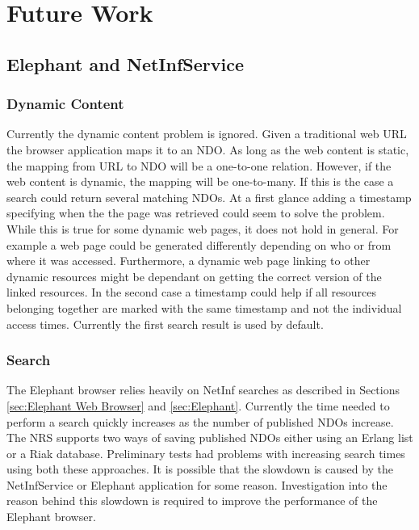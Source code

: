 \section{Future Work}

\subsection{Elephant and NetInfService}

\subsubsection{Dynamic Content}

Currently the dynamic content problem is ignored. Given a traditional web URL the browser application maps it to an NDO. As long as the web content is static, the mapping from URL to NDO will be a one-to-one relation. However, if the web content is dynamic, the mapping will be one-to-many. If this is the case a search could return several matching NDOs. At a first glance adding a timestamp specifying when the the page was retrieved could seem to solve the problem. While this is true for some dynamic web pages, it does not hold in general. For example a web page could be generated differently depending on who or from where it was accessed. Furthermore, a dynamic web page linking to other dynamic resources might be dependant on getting the correct version of the linked resources. In the second case a timestamp could help if all resources belonging together are marked with the same timestamp and not the individual access times. Currently the first search result is used by default.

\subsubsection{Search}

The Elephant browser relies heavily on NetInf searches as described in Sections \ref{sec:Elephant Web Browser} and \ref{sec:Elephant}. Currently the time needed to perform a search quickly increases as the number of published NDOs increase. The NRS supports two ways of saving published NDOs either using an Erlang list or a Riak database. Preliminary tests had problems with increasing search times using both these approaches. It is possible that the slowdown is caused by the NetInfService or Elephant application for some reason. Investigation into the reason behind this slowdown is required to improve the performance of the Elephant browser.


